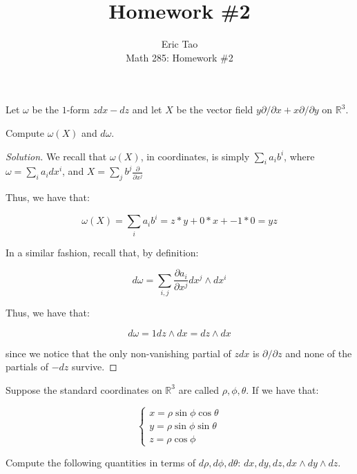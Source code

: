 \documentclass[10pt]{article}
\newenvironment{problem}[2][]{\begin{trivlist}
\item[\hskip \labelsep {\bfseries #1}\hskip \labelsep {\bfseries #2.}]}{\end{trivlist}}
\begin{document}
 
\title{Homework \#2}
\author{Eric Tao\\
Math 285: Homework \#2}
\maketitle

\begin{problem}{Question 1}

Let $\omega$ be the $1$-form $zdx - dz$ and let $X$ be the vector field $y \partial/\partial x + x \partial/\partial y$ on $\mathbb{R}^3$.

Compute $\omega(X)$ and $d\omega$. 

\end{problem}

\begin{proof}[Solution]

We recall that $\omega(X)$, in coordinates, is simply $\sum_{i} a_i b^i$, where $\omega = \sum_i a_i dx^i$, and $X = \sum_j b^j \frac{\partial}{\partial x^j} $

Thus, we have that:

$$\omega(X) = \sum_{i} a_i b^i = z * y + 0 * x + -1 * 0 = yz $$

In a similar fashion, recall that, by definition:

$$ d\omega = \sum_{i,j} \frac{\partial a_i}{\partial x^j} dx^j \wedge dx^i$$

Thus, we have that:

$$ d\omega = 1 dz \wedge dx = dz \wedge dx $$

since we notice that the only non-vanishing partial of $z dx$ is $\partial/\partial z$ and none of the partials of $-dz$ survive. 

\end{proof}

\begin{problem}{Question 2}

Suppose the standard coordinates on $\mathbb{R}^3$ are called $\rho, \phi, \theta$. If we have that:

$$ \begin{cases} x = \rho \sin \phi \cos \theta \\  y = \rho \sin \phi \sin \theta \\ z = \rho \cos \phi \end{cases} $$

Compute the following quantities in terms of $d\rho, d\phi, d\theta$: $dx, dy, dz, dx\wedge dy \wedge dz$.

\end{problem}
\end{document}
